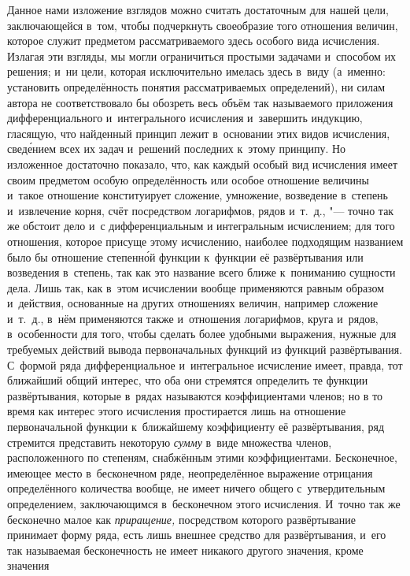 Данное нами изложение взглядов можно считать достаточным для нашей цели,
заключающейся в~том, чтобы подчеркнуть своеобразие того отношения величин,
которое служит предметом рассматриваемого здесь особого вида исчисления.
Излагая эти взгляды, мы могли ограничиться простыми задачами и~способом их
решения; и~ни цели, которая исключительно имелась здесь в~виду (а~именно:
установить определённость понятия рассматриваемых определений), ни силам автора
не соответствовало бы обозреть весь объём так называемого приложения
дифференциального и~интегрального исчисления и~завершить индукцию, гласящую,
что найденный принцип лежит в~основании этих видов исчисления, свед\'{е}нием всех
их задач и~решений последних к~этому принципу. Но изложенное достаточно
показало, что, как каждый особый вид исчисления имеет своим предметом особую
определённость или особое отношение величины и~такое отношение конституирует
сложение, умножение, возведение в~степень и~извлечение корня, счёт посредством
логарифмов, рядов и~т.~д., "--- точно так же обстоит дело и~с дифференциальным
и интегральным исчислением; для того отношения, которое присуще этому
исчислению, наиболее подходящим названием было бы отношение степенн\'{о}й
функции к~функции её развёртывания или возведения в~степень, так как это
название всего ближе к~пониманию сущности дела. Лишь так, как в~этом исчислении
вообще применяются равным образом и~действия, основанные на других отношениях
величин, например сложение и~т.~д., в~нём применяются также и~отношения
логарифмов, круга и~рядов, в~особенности для того, чтобы сделать более удобными
выражения, нужные для требуемых действий вывода первоначальных функций из
функций развёртывания. С~формой ряда дифференциальное и~интегральное исчисление
имеет, правда, тот ближайший общий интерес, что оба они стремятся определить те
функции развёртывания, которые в~рядах называются коэффициентами членов; но в
то время как интерес этого исчисления простирается лишь на отношение
первоначальной функции к~ближайшему коэффициенту её развёртывания, ряд
стремится представить некоторую {\em сумму} в~виде множества членов,
расположенного по степеням, снабжённым этими коэффициентами. Бесконечное,
имеющее место в~бесконечном ряде, неопределённое выражение отрицания
определённого количества вообще, не имеет ничего общего с~утвердительным
определением, заключающимся в~бесконечном этого исчисления. И~точно так же
бесконечно малое как {\em приращение,} посредством которого развёртывание
принимает форму ряда, есть лишь внешнее средство для развёртывания, и~его так
называемая бесконечность не имеет никакого другого значения, кроме значения
